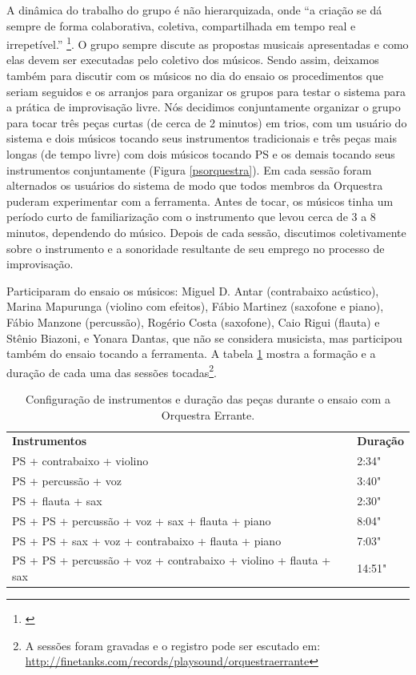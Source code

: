 A dinâmica do trabalho do grupo é não hierarquizada, onde ``a criação se dá sempre de forma colaborativa, coletiva, compartilhada em tempo real e irrepetível.'' \footnote{\cite{costa2013orquestra}}. O grupo sempre discute as propostas musicais apresentadas e como elas devem ser executadas pelo coletivo dos músicos. Sendo assim, deixamos também para discutir com os músicos no dia do ensaio os procedimentos que seriam seguidos e os arranjos para organizar os grupos para testar o sistema para a prática de improvisação livre. Nós decidimos conjuntamente organizar o grupo para tocar três peças curtas (de cerca de 2 minutos) em trios, com um usuário do sistema e dois músicos tocando seus instrumentos tradicionais e três peças mais longas (de tempo livre) com dois músicos tocando PS e os demais tocando seus instrumentos conjuntamente (Figura \ref{psorquestra}). Em cada sessão foram alternados os usuários do sistema de modo que todos membros da Orquestra puderam experimentar com a ferramenta. Antes de tocar, os músicos tinha um período curto de familiarização com o instrumento que levou cerca de 3 a 8 minutos, dependendo do músico. Depois de cada sessão, discutimos coletivamente sobre o instrumento e a sonoridade resultante de seu emprego no processo de improvisação.


Participaram do ensaio os músicos: Miguel D. Antar (contrabaixo acústico), Marina Mapurunga (violino com efeitos), Fábio Martinez (saxofone e piano), Fábio Manzone (percussão), Rogério Costa (saxofone), Caio Rigui (flauta) e Stênio Biazoni, e Yonara Dantas, que não se considera musicista, mas participou também do ensaio tocando a ferramenta. A tabela \ref{tab:orchestra} mostra a formação e a duração de cada uma das sessões tocadas\footnote{A sessões foram gravadas e o registro pode ser escutado em: \url{http://finetanks.com/records/playsound/orquestraerrante}}.  

\begin{table}[ht]
\caption{Configuração de instrumentos e duração das peças durante o ensaio com a Orquestra Errante.}
\begin{tabular}{ll}
\textbf{Instrumentos}                                                    & \textbf{Duração} \\
PS + contrabaixo + violino                                & 2:34"         \\
PS + percussão + voz                                                 & 3:40"         \\
PS + flauta + sax                                                        & 2:30"         \\
PS + PS + percussão + voz + sax + flauta + piano                      & 8:04"         \\
PS + PS + sax + voz + contrabaixo + flauta + piano                   & 7:03"         \\
PS + PS + percussão + voz + contrabaixo + violino + flauta + sax & 14:51"       
\end{tabular}
\label{tab:orchestra}
\end{table}



